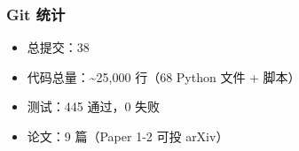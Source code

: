\documentclass[
  12pt,
]{ctexart}
\providecommand{\tightlist}{%
  \setlength{\itemsep}{0pt}\setlength{\parskip}{0pt}}
\begin{document}
\subsubsection{Git 统计}\label{git-ux7edfux8ba1}

\begin{itemize}
\tightlist
\item
  总提交：38
\item
  代码总量：\textasciitilde25,000 行（68 Python 文件 + 脚本）
\item
  测试：445 通过，0 失败
\item
  论文：9 篇（Paper 1-2 可投 arXiv）
\end{itemize}
\end{document}
